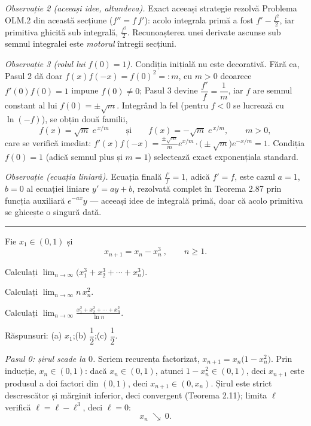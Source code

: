 \emph{Observație 2 (aceeași idee, altundeva).} Exact aceeași strategie rezolvă Problema OLM.2 din această secțiune ($f''=f\,f'$): acolo integrala primă a fost $f'-\frac{f^{2}}{2}$, iar primitiva ghicită sub integrală, $\frac{f^{2}}{2}$. Recunoașterea unei derivate ascunse sub semnul integralei este \emph{motorul} întregii secțiuni.

\emph{Observație 3 (rolul lui $f(0)=1$).} Condiția inițială nu este decorativă. Fără ea, Pasul 2 dă doar $f(x)f(-x)=f(0)^{2}=:m$, cu $m>0$ deoarece $f'(0)f(0)=1$ impune $f(0)\neq0$; Pasul 3 devine $\dfrac{f'}{f}=\dfrac{1}{m}$, iar $f$ are semnul constant al lui $f(0)=\pm\sqrt m$. Integrând la fel (pentru $f<0$ se lucrează cu $\ln(-f)$), se obțin două familii,
\[ f(x)=\sqrt{m}\;e^{\,x/m}\qquad\text{și}\qquad f(x)=-\sqrt{m}\;e^{\,x/m},\qquad m>0 , \]
care se verifică imediat: $f'(x)f(-x)=\frac{\pm\sqrt m}{m}e^{x/m}\cdot\bigl(\pm\sqrt m\bigr)e^{-x/m}=1$. Condiția $f(0)=1$ (adică semnul plus și $m=1$) selectează exact exponențiala standard.

\emph{Observație (ecuația liniară).} Ecuația finală $\frac{f'}{f}=1$, adică $f'=f$, este cazul $a=1$, $b=0$ al ecuației liniare $y'=ay+b$, rezolvată complet în Teorema 2.87 prin funcția auxiliară $e^{-ax}y$ --- aceeași idee de integrală primă, doar că acolo primitiva se ghicește o singură dată.
\vspace{1mm}\hrule

Fie $x_{1}\in(0,1)$ și
\[ x_{n+1}=x_{n}-x_{n}^{3}\ ,\qquad n\ge1 . \]
\begin{parti}
  \item Calculați $\displaystyle\lim_{n\to\infty}\bigl(x_{1}^{3}+x_{2}^{3}+\cdots+x_{n}^{3}\bigr)$.
  \item Calculați $\displaystyle\lim_{n\to\infty}n\,x_{n}^{2}$.
  \item Calculați $\displaystyle\lim_{n\to\infty}\frac{x_{1}^{2}+x_{2}^{2}+\cdots+x_{n}^{2}}{\ln n}$.
\end{parti}
\sol Răspunsuri: (a) $x_{1}$;\qquad (b) $\dfrac12$;\qquad (c) $\dfrac12$.

\emph{Pasul 0: șirul scade la $0$.} Scriem recurența factorizat, $x_{n+1}=x_{n}\bigl(1-x_{n}^{2}\bigr)$. Prin inducție, $x_{n}\in(0,1)$: dacă $x_{n}\in(0,1)$, atunci $1-x_{n}^{2}\in(0,1)$, deci $x_{n+1}$ este produsul a doi factori din $(0,1)$, deci $x_{n+1}\in(0,x_{n})$. Șirul este strict descrescător și mărginit inferior, deci convergent (Teorema 2.11); limita $\ell$ verifică $\ell=\ell-\ell^{3}$, deci $\ell=0$:
\[ x_{n}\ \searrow\ 0 . \]

